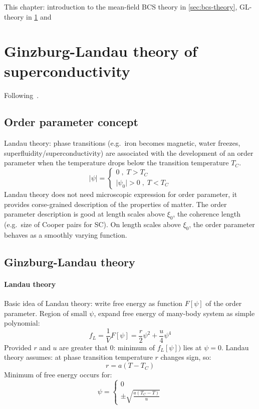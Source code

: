\documentclass[../notes.tex]{subfiles}
\begin{document}
This chapter: introduction to the mean-field BCS theory in \cref{sec:bcs-theory}, GL-theory in \cref{sec:Ginzburg-Landau theory of superconductivity} and


\section{Ginzburg-Landau theory of superconductivity}\label{sec:Ginzburg-Landau theory of superconductivity}

Following~\cite[ch. 11]{colemanIntroductionManyBodyPhysics2015}.

\subsection{Order parameter concept}

Landau theory: phase transitions (e.g.\ iron becomes magnetic, water freezes, superfluidity/superconductivity) are associated with the development of an order parameter when the temperature drops below the transition temperature \(T_C\).
\begin{equation}
	\vert \psi \vert =
	\begin{cases}
		0\;,\; T > T_C \\
		\vert \psi_0 \vert > 0 \;,\; T < T_C
	\end{cases}
\end{equation}
Landau theory does not need microscopic expression for order parameter, it provides corse-grained description of the properties of matter.
The order parameter description is good at length scales above \(\xi_0\), the coherence length (e.g.\ size of Cooper pairs for SC).
On length scales above \(\xi_0\), the order parameter behaves as a smoothly varying function.

\subsection{Ginzburg-Landau theory}

\paragraph{Landau theory}

Basic idea of Landau theory: write free energy as function \(F[\psi]\) of the order parameter.
Region of small \(\psi\), expand free energy of many-body system as simple polynomial:
\begin{equation}
	f_{L} = \frac{1}{V} F[\psi] = \frac{r}{2} \psi^2 + \frac{u}{4} \psi^4
\end{equation}
Provided \(r\) and \(u\) are greater that \(0\): minimum of \(f_L [\psi])\) lies at \(\psi = 0\).
Landau theory assumes: at phase transition temperature \(r\) changes sign, so:
\begin{equation}
	r = a(T - T_C)
\end{equation}
Minimum of free energy occurs for:
\begin{equation}
	\psi = \begin{cases}
		0 \\
		\pm \sqrt{\frac{a (T_C - T)}{u} }
	\end{cases}
\end{equation}
\end{document}

